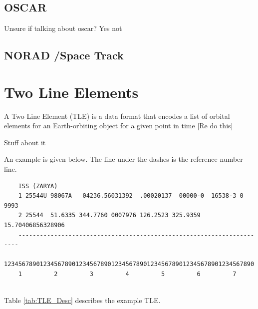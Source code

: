 \documentclass[12pt]{report}
\begin{document}
	\subsection{OSCAR}
	Unsure if talking about oscar? Yes not
	\subsection{NORAD /Space Track}
	
	\newpage
	\section{Two Line Elements}
	A Two Line Element (TLE) is a data format that encodes a list of orbital elements for an Earth-orbiting object for a given point in time [Re do this]

	
	Stuff about it\par
	An example is given below. The line under the dashes is the reference number line.
	\begin{verbatim}
	ISS (ZARYA)
	1 25544U 98067A   04236.56031392  .00020137  00000-0  16538-3 0  9993
	2 25544  51.6335 344.7760 0007976 126.2523 325.9359 15.70406856328906
	----------------------------------------------------------------------
	1234567890123456789012345678901234567890123456789012345678901234567890   
	1         2         3         4         5         6         7
	
	\end{verbatim}
	Table \ref{tab:TLE_Desc}\cite{SpaceTrackTLE} describes the example TLE. 
	
\end{document}
